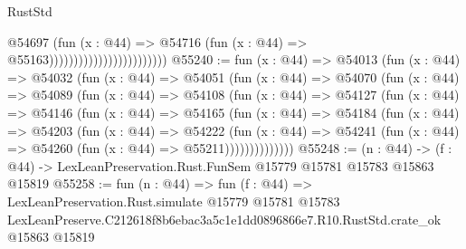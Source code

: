\begin{lexlean}{RustStd}
\begin{coremodule}
                                              @54697
                                                (fun (x : @44) =>
                                                @54716
                                                  (fun (x : @44) => @55163))))))))))))))))))))))))
@55240 := fun (x : @44) =>
  @54013
    (fun (x : @44) =>
    @54032
      (fun (x : @44) =>
      @54051
        (fun (x : @44) =>
        @54070
          (fun (x : @44) =>
          @54089
            (fun (x : @44) =>
            @54108
              (fun (x : @44) =>
              @54127
                (fun (x : @44) =>
                @54146
                  (fun (x : @44) =>
                  @54165
                    (fun (x : @44) =>
                    @54184
                      (fun (x : @44) =>
                      @54203
                        (fun (x : @44) =>
                        @54222
                          (fun (x : @44) =>
                          @54241 (fun (x : @44) => @54260 (fun (x : @44) => @55211))))))))))))))
@55248 := (n : @44) ->
  (f : @44) -> LexLeanPreservation.Rust.FunSem @15779 @15781 @15783 @15863 @15819
@55258 := fun (n : @44) =>
  fun (f : @44) =>
  LexLeanPreservation.Rust.simulate
    @15779
    @15781
    @15783
    LexLeanPreserve.C212618f8b6ebac3a5c1e1dd0896866e7.R10.RustStd.crate_ok
    @15863
    @15819
\end{coremodule}
\end{lexlean}
